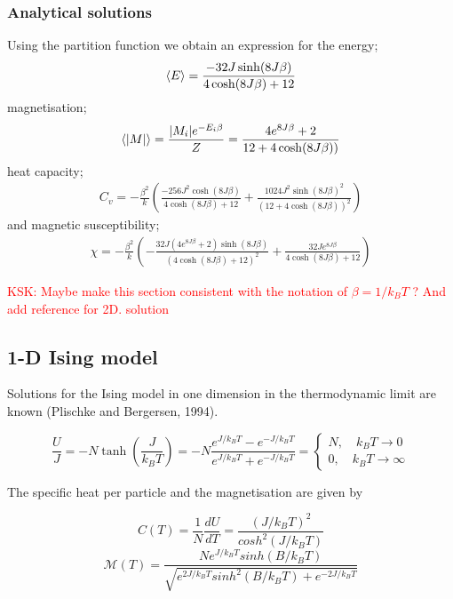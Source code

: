 \documentclass[11pt,a4paper,english,draft]{article}
\numberwithin{equation}{section}
\newcommand{\magM}{\mathcal{M}}
\begin{document}
\subsubsection{Analytical solutions}
Using the partition function we obtain an expression for the energy;
\begin{gather}
\expval{E} = \frac{-32J\sinh(8J\beta)}{4\cosh(8J\beta)+12}
\end{gather}
magnetisation;
\begin{gather}
\expval{\abs{M}} = \frac{\abs{M_i}e^{-E_i\beta}}{Z}
= \frac{4e^{8J\beta} + 2}{12+4\cosh(8J\beta))}
\end{gather}
heat capacity;
\begin{gather}
C_v = -\frac{\beta^2}{k}\left(\frac{-256J^2\cosh(8J\beta)}{4\cosh(8J\beta) + 12}
 + \frac{1024J^2\sinh(8J\beta)^2}{(12+4\cosh(8J\beta))^2}\right)
\end{gather}
and magnetic susceptibility;
\begin{gather}
\chi = -\frac{\beta^2}{k}\left(- \frac{32 J \left(4 e^{8 J \beta} + 2\right) \sinh{\left (8 J \beta \right )}}{
\left(4 \cosh{\left (8 J \beta \right )} + 12\right)^{2}} 
+ \frac{32 J e^{8 J \beta}}{4 \cosh(8 J \beta) + 12}\right)
\end{gather}




\textcolor{red}{KSK: Maybe make this section consistent with the notation of $\beta = 1/ k_B T$ ? And add reference for 2D. solution}

\subsection{1-D Ising model}
Solutions for the Ising model in one dimension in the 
thermodynamic limit are known (Plischke and Bergersen, 1994). 

\begin{equation}
\frac{U}{J} = -N \tanh \left( \frac{J}{k_B T} \right) = -N \frac{e^{J/k_B T}-e^{-J/k_B T} }{e^{J/k_B T}+ e^{-J/k_B T} } =  \begin{cases} N, \quad k_B T \to 0 \\ 0, \quad  k_B T \to \infty \end{cases}
\end{equation}

The specific heat per particle and the magnetisation are given by 

\begin{equation}
C(T) = \frac{1}{N} \frac{dU}{dT} = \frac{(J/k_B T)^2}{cosh^2 (J/k_B T)}
\end{equation}
\begin{equation}
\magM(T) = \frac{N e^{J / k_B T} sinh(B/k_B T) }{ \sqrt{ e^{2J/k_B T} sinh^2 (B/k_B T) + e^{-2J/ k_B T}  } }
\end{equation}
\end{document}
